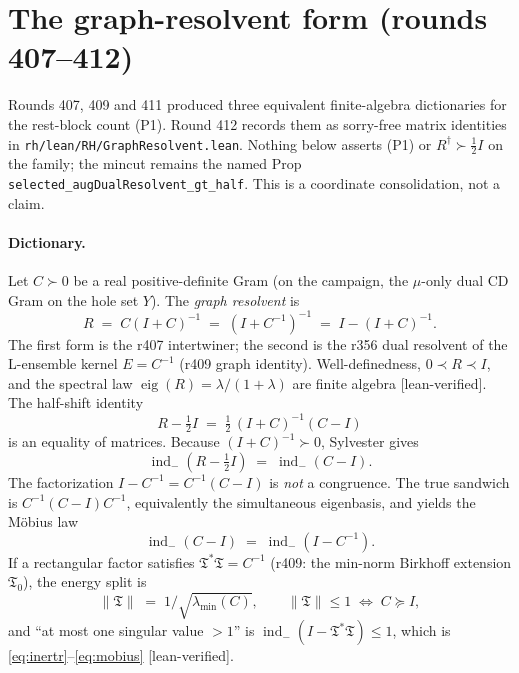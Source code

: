 \documentclass[11pt]{article}
\theoremstyle{remark}
\newcommand{\Rd}{R^{\dagger}}
\newcommand{\half}{\tfrac12}
\newcommand{\Tfrak}{\mathfrak{T}}
\newcommand{\gr}[1]{\textnormal{\small[#1]}}
\begin{document}
\section{The graph-resolvent form (rounds 407--412)}\label{sec:graph}

Rounds 407, 409 and 411 produced three equivalent finite-algebra
dictionaries for the rest-block count (P1).  Round 412 records them
as sorry-free matrix identities in
\texttt{rh/lean/RH/GraphResolvent.lean}.  Nothing below asserts (P1)
or $\Rd\succ\half I$ on the family; the mincut remains the named
Prop \texttt{selected\_augDualResolvent\_gt\_half}.  This is a
coordinate consolidation, not a claim.

\paragraph{Dictionary.}
Let $C\succ0$ be a real positive-definite Gram (on the campaign,
the $\mu$-only dual CD Gram on the hole set $Y$).  The
\emph{graph resolvent} is
\begin{equation}\label{eq:graphR}
R \;=\; C(I+C)^{-1}
 \;=\; (I+C^{-1})^{-1}
 \;=\; I-(I+C)^{-1}.
\end{equation}
The first form is the r407 intertwiner; the second is the
r356 dual resolvent of the L-ensemble kernel $E=C^{-1}$
(r409 graph identity).  Well-definedness, $0\prec R\prec I$, and
the spectral law $\operatorname{eig}(R)=\lambda/(1+\lambda)$ are
finite algebra \gr{lean-verified}.  The half-shift identity
\begin{equation}\label{eq:halfshift}
R-\half I
 \;=\;
 \half\,(I+C)^{-1}(C-I)
\end{equation}
is an equality of matrices.  Because $(I+C)^{-1}\succ0$, Sylvester
gives
\begin{equation}\label{eq:inertr}
\operatorname{ind}_{-}(R-\half I)
 \;=\;
 \operatorname{ind}_{-}(C-I).
\end{equation}
The factorization $I-C^{-1}=C^{-1}(C-I)$ is \emph{not} a
congruence.  The true sandwich is $C^{-1}(C-I)C^{-1}$, equivalently
the simultaneous eigenbasis, and yields the M\"obius law
\begin{equation}\label{eq:mobius}
\operatorname{ind}_{-}(C-I)
 \;=\;
 \operatorname{ind}_{-}(I-C^{-1}).
\end{equation}
If a rectangular factor satisfies $\Tfrak^{*}\Tfrak=C^{-1}$
(r409: the min-norm Birkhoff extension $\Tfrak_{0}$), the
energy split is
\begin{equation}\label{eq:esplit}
\|\Tfrak\|
 \;=\;
 1\big/\sqrt{\lambda_{\min}(C)},
\qquad
\|\Tfrak\|\le 1
 \;\iff\;
 C\succeq I,
\end{equation}
and ``at most one singular value $>1$'' is
$\operatorname{ind}_{-}(I-\Tfrak^{*}\Tfrak)\le1$, which is
\eqref{eq:inertr}--\eqref{eq:mobius} \gr{lean-verified}.
\end{document}
